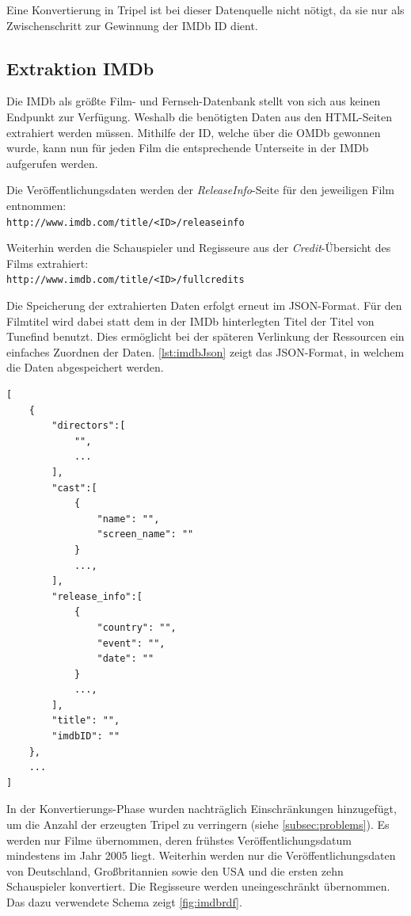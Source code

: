 \documentclass[parskip]{scrartcl}
\begin{document}
Eine Konvertierung in Tripel ist bei dieser Datenquelle nicht nötigt, da sie nur als Zwischenschritt zur Gewinnung der IMDb ID dient.

\subsection{Extraktion IMDb}
\label{subsec:imdb}

Die IMDb als größte Film- und Fernseh-Datenbank stellt von sich aus keinen Endpunkt zur Verfügung. Weshalb die benötigten Daten aus den HTML-Seiten extrahiert werden müssen. Mithilfe der ID, welche über die OMDb gewonnen wurde, kann nun für jeden Film die entsprechende Unterseite in der IMDb aufgerufen werden.

Die Veröffentlichungsdaten werden der \textit{ReleaseInfo}-Seite für den jeweiligen Film entnommen:\\
\texttt{http://www.imdb.com/title/<ID>/releaseinfo}

Weiterhin werden die Schauspieler und Regisseure aus der \textit{Credit}-Übersicht des Films extrahiert:\\
\texttt{http://www.imdb.com/title/<ID>/fullcredits}

Die Speicherung der extrahierten Daten erfolgt erneut im JSON-Format. Für den Filmtitel wird dabei statt dem in der IMDb hinterlegten Titel der Titel von Tunefind benutzt. Dies ermöglicht bei der späteren Verlinkung der Ressourcen ein einfaches Zuordnen der Daten. \autoref{lst:imdbJson} zeigt das JSON-Format, in welchem die Daten abgespeichert werden.

\begin{lstlisting}[caption={IMDb JSON-Format}, label={lst:imdbJson}]
[  
    {  
        "directors":[  
            "",
            ...
        ],
        "cast":[
            {
                "name": "",
                "screen_name": ""
            }
            ...,
        ],
        "release_info":[
            {
                "country": "",
                "event": "",
                "date": ""
            }
            ...,
        ],
        "title": "",
        "imdbID": ""
    },
    ...
]
\end{lstlisting}

In der Konvertierungs-Phase wurden nachträglich Einschränkungen hinzugefügt, um die Anzahl der erzeugten Tripel zu verringern (siehe \ref{subsec:problems}). Es werden nur Filme übernommen, deren frühstes Veröffentlichungsdatum mindestens im Jahr 2005 liegt. Weiterhin werden nur die Veröffentlichungsdaten von Deutschland, Großbritannien sowie den USA und die ersten zehn Schauspieler konvertiert. Die Regisseure werden uneingeschränkt übernommen. Das dazu verwendete Schema zeigt \autoref{fig:imdbrdf}.
\end{document}
